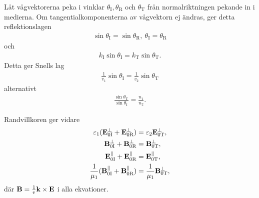 Låt vågvektorerna peka i vinklar $\theta_{\text{I}}, \theta_{\text{R}}$ och $\theta_{\text{T}}$ från normalriktningen pekande in i medierna. Om tangentialkomponenterna av vågvektorn ej ändras, ger detta reflektionslagen
\begin{align*}
	\sin{\theta_{\text{I}}} = \sin{\theta_{\text{R}}},\ \theta_{\text{I}} = \theta_{\text{R}}
\end{align*}
och
\begin{align*}
	k_{\text{I}}\sin{\theta_{\text{I}}} = k_{\text{T}}\sin{\theta_{\text{T}}}.
\end{align*}
Detta ger Snells lag
\begin{align*}
	\frac{1}{v_{1}}\sin{\theta_{\text{I}}} = \frac{1}{v_{2}}\sin{\theta_{\text{T}}}
\end{align*}
alternativt
\begin{align*}
	\frac{\sin{\theta_{\text{T}}}}{\sin{\theta_{\text{I}}}} = \frac{n_{1}}{n_{2}}.
\end{align*}

Randvillkoren ger vidare
\begin{align*}
	\varepsilon_{1}(\vb{E}_{0\text{I}}^{\perp} + \vb{E}_{0\text{R}}^{\perp})           &= \varepsilon_{2}\vb{E}_{0\text{T}}^{\perp}, \\
	\vb{B}_{0\text{I}}^{\perp} + \vb{B}_{0\text{R}}^{\perp}                            &= \vb{B}_{0\text{T}}^{\perp}, \\
	\vb{E}_{0\text{I}}^{\parallel} + \vb{E}_{0\text{R}}^{\parallel}                    &= \vb{E}_{0\text{T}}^{\parallel}, \\
	\frac{1}{\mu_{1}}(\vb{B}_{0\text{I}}^{\parallel} + \vb{B}_{0\text{R}}^{\parallel}) &= \frac{1}{\mu_{1}}\vb{B}_{0\text{T}}^{\perp},
\end{align*}
där $\vb{B} = \frac{1}{v}\vb{k}\times\vb{E}$ i alla ekvationer.

